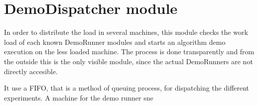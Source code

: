 \section{DemoDispatcher module}
\label{sec:DemoDispatcher}
In order to distribute the load in several machines, this module checks the work load of each known DemoRunner modules and starts an algorithm demo execution on the less loaded machine. The process is done transparently and from the outside this is the only visible module, since the actual DemoRunners are not directly accesible.

It use a FIFO, that is a method of queuing process, for dispatching the different experiments. A machine for the demo runner sne


